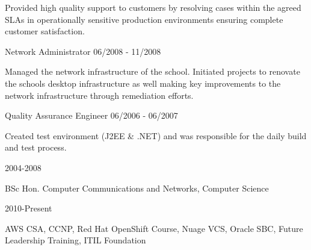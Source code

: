 \documentclass[11pt]{article} %
\begin{document}
\begin{description}
Provided high quality support to customers by resolving cases within the agreed SLAs in operationally sensitive production environments ensuring complete customer satisfaction.

           {Network Administrator}
           {06/2008 - 11/2008}

Managed the network infrastructure of the school. Initiated projects to renovate the schools desktop infrastructure as well making key improvements to the network infrastructure through remediation efforts.

           {Quality Assurance Engineer}
           {06/2006 - 06/2007}

Created test environment (J2EE \& .NET) and was responsible for the daily build and test process.


\end{description}


\begin{description}
\squish
{}
           {}
           {2004-2008}

BSc Hon. Computer Communications and Networks, Computer Science

           {}
           {2010-Present}

AWS CSA, CCNP, Red Hat OpenShift Course, Nuage VCS, Oracle SBC, Future Leadership Training, ITIL Foundation


\end{description}

%
%
%
%
%
\end{document}
